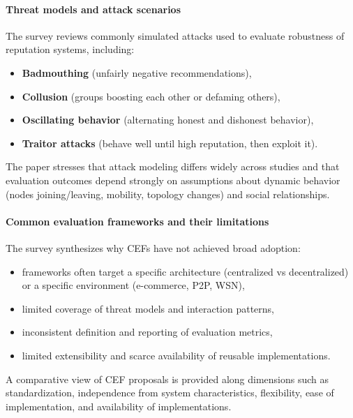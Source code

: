 \documentclass[11pt,a4paper]{article}
\begin{document}
\paragraph{Threat models and attack scenarios}
The survey reviews commonly simulated attacks used to evaluate robustness of reputation systems, including:
\begin{itemize}[leftmargin=*]
  \item \textbf{Badmouthing} (unfairly negative recommendations),
  \item \textbf{Collusion} (groups boosting each other or defaming others),
  \item \textbf{Oscillating behavior} (alternating honest and dishonest behavior),
  \item \textbf{Traitor attacks} (behave well until high reputation, then exploit it).
\end{itemize}
The paper stresses that attack modeling differs widely across studies and that evaluation outcomes depend strongly on assumptions about dynamic behavior (nodes joining/leaving, mobility, topology changes) and social relationships.

\paragraph{Common evaluation frameworks and their limitations}
The survey synthesizes why CEFs have not achieved broad adoption:
\begin{itemize}[leftmargin=*]
  \item frameworks often target a specific architecture (centralized vs decentralized) or a specific environment (e-commerce, P2P, WSN),
  \item limited coverage of threat models and interaction patterns,
  \item inconsistent definition and reporting of evaluation metrics,
  \item limited extensibility and scarce availability of reusable implementations.
\end{itemize}
A comparative view of CEF proposals is provided along dimensions such as standardization, independence from system characteristics, flexibility, ease of implementation, and availability of implementations.
\end{document}
